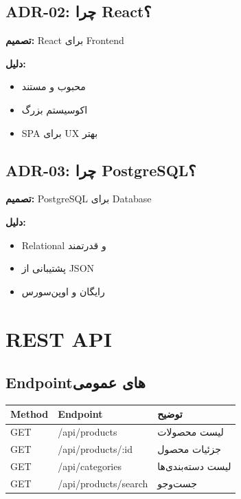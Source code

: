 \documentclass[12pt, a4paper]{article}
\begin{document}
\subsection{ADR-02: چرا React؟}

\textbf{تصمیم:} React برای Frontend

\textbf{دلیل:}
\begin{itemize}
    \item محبوب و مستند
    \item اکوسیستم بزرگ
    \item SPA برای UX بهتر
\end{itemize}

\subsection{ADR-03: چرا PostgreSQL؟}

\textbf{تصمیم:} PostgreSQL برای Database

\textbf{دلیل:}
\begin{itemize}
    \item Relational و قدرتمند
    \item پشتیبانی از JSON
    \item رایگان و اوپن‌سورس
\end{itemize}

\section{REST API}

\subsection{Endpointهای عمومی}

\begin{center}
\begin{tabular}{|l|l|l|}
\hline
\textbf{Method} & \textbf{Endpoint} & \textbf{توضیح} \\
\hline
GET & /api/products & لیست محصولات \\
\hline
GET & /api/products/:id & جزئیات محصول \\
\hline
GET & /api/categories & لیست دسته‌بندی‌ها \\
\hline
GET & /api/products/search & جست‌وجو \\
\hline
\end{tabular}
\end{center}
\end{document}
